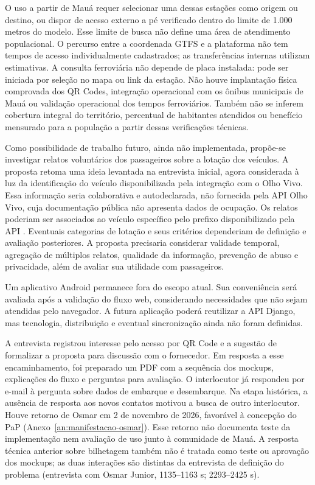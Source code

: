 O uso a partir de Mauá requer selecionar uma dessas estações como origem ou destino, ou dispor de acesso externo a pé verificado dentro do limite de 1.000 metros do modelo. Esse limite de busca não define uma área de atendimento populacional. O percurso entre a coordenada GTFS e a plataforma não tem tempos de acesso individualmente cadastrados; as transferências internas utilizam estimativas. A consulta ferroviária não depende de placa instalada: pode ser iniciada por seleção no mapa ou link da estação. Não houve implantação física comprovada dos QR Codes, integração operacional com os ônibus municipais de Mauá ou validação operacional dos tempos ferroviários. Também não se inferem cobertura integral do território, percentual de habitantes atendidos ou benefício mensurado para a população a partir dessas verificações técnicas.


Como possibilidade de trabalho futuro, ainda não implementada, propõe-se investigar relatos voluntários dos passageiros sobre a lotação dos veículos. A proposta retoma uma ideia levantada na entrevista inicial, agora considerada à luz da identificação do veículo disponibilizada pela integração com o Olho Vivo. Essa informação seria colaborativa e autodeclarada, não fornecida pela API Olho Vivo, cuja documentação pública não apresenta dados de ocupação. Os relatos poderiam ser associados ao veículo específico pelo prefixo disponibilizado pela API \citep{sptransapi}. Eventuais categorias de lotação e seus critérios dependeriam de definição e avaliação posteriores. A proposta precisaria considerar validade temporal, agregação de múltiplos relatos, qualidade da informação, prevenção de abuso e privacidade, além de avaliar sua utilidade com passageiros.

Um aplicativo Android permanece fora do escopo atual. Sua conveniência será avaliada após a validação do fluxo web, considerando necessidades que não sejam atendidas pelo navegador. A futura aplicação poderá reutilizar a API Django, mas tecnologia, distribuição e eventual sincronização ainda não foram definidas.

A entrevista registrou interesse pelo acesso por QR Code e a sugestão de formalizar a proposta para discussão com o fornecedor. Em resposta a esse encaminhamento, foi preparado um PDF com a sequência dos mockups, explicações do fluxo e perguntas para avaliação. O interlocutor já respondeu por e-mail à pergunta sobre dados de embarque e desembarque. Na etapa histórica, a ausência de resposta aos novos contatos motivou a busca de outro interlocutor. Houve retorno de Osmar em 2 de novembro de 2026, favorável à concepção do PaP (Anexo~\ref{an:manifestacao-osmar}). Esse retorno não documenta teste da implementação nem avaliação de uso junto à comunidade de Mauá. A resposta técnica anterior sobre bilhetagem também não é tratada como teste ou aprovação dos mockups; as duas interações são distintas da entrevista de definição do problema (entrevista com Osmar Junior, 1135--1163 s; 2293--2425 s).

